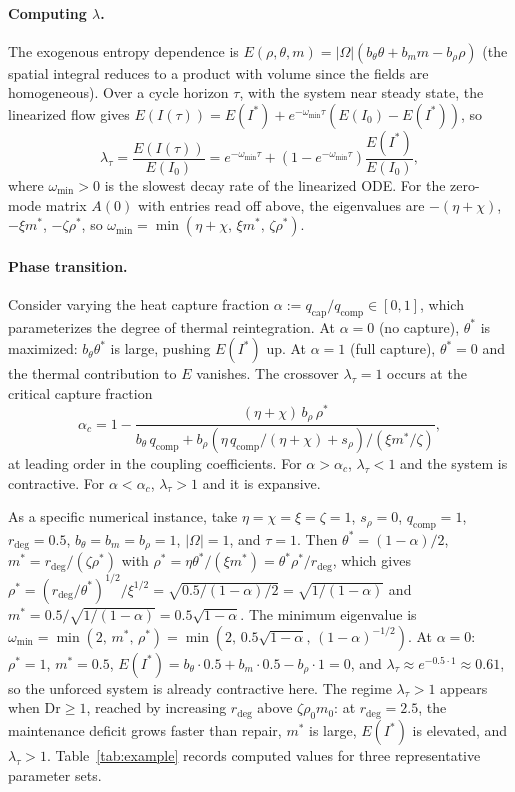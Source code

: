 \documentclass[10pt,twocolumn]{article}
\theoremstyle{plain}
\theoremstyle{definition}
\theoremstyle{remark}
\begin{document}
\paragraph{Computing $\lambda$.} The exogenous entropy dependence is
$E(\rho,\theta,m) = |\Omega|(b_\theta\theta + b_m m - b_\rho\rho)$ (the
spatial integral reduces to a product with volume since the fields are
homogeneous). Over a cycle horizon $\tau$, with the system near steady
state, the linearized flow gives
$E(I(\tau)) = E(I^*) + e^{-\omega_{\min}\tau}(E(I_0) - E(I^*))$, so
\[
  \lambda_\tau = \frac{E(I(\tau))}{E(I_0)}
  = e^{-\omega_{\min}\tau} + (1 - e^{-\omega_{\min}\tau})
    \frac{E(I^*)}{E(I_0)},
\]
where $\omega_{\min} > 0$ is the slowest decay rate of the linearized
ODE. For the zero-mode matrix $A(0)$ with entries read off above, the
eigenvalues are $-(\eta+\chi)$, $-\xi m^*$, $-\zeta\rho^*$, so
$\omega_{\min} = \min(\eta+\chi,\,\xi m^*,\,\zeta\rho^*)$.

\paragraph{Phase transition.} Consider varying the heat capture
fraction $\alpha := q_{\mathrm{cap}}/q_{\mathrm{comp}} \in [0,1]$, which
parameterizes the degree of thermal reintegration. At $\alpha = 0$ (no
capture), $\theta^*$ is maximized: $b_\theta\theta^*$ is large,
pushing $E(I^*)$ up. At $\alpha = 1$ (full capture), $\theta^* = 0$
and the thermal contribution to $E$ vanishes. The crossover
$\lambda_\tau = 1$ occurs at the critical capture fraction
\[
  \alpha_c = 1 - \frac{(\eta+\chi)\,b_\rho\,\rho^*}
    {b_\theta\,q_{\mathrm{comp}} + b_\rho(\eta\,q_{\mathrm{comp}}/(\eta+\chi) + s_\rho)/(\xi m^*/\zeta)},
\]
at leading order in the coupling coefficients. For $\alpha > \alpha_c$,
$\lambda_\tau < 1$ and the system is contractive. For $\alpha < \alpha_c$,
$\lambda_\tau > 1$ and it is expansive.

As a specific numerical instance, take $\eta = \chi = \xi = \zeta = 1$,
$s_\rho = 0$, $q_{\mathrm{comp}} = 1$, $r_{\mathrm{deg}} = 0.5$,
$b_\theta = b_m = b_\rho = 1$, $|\Omega| = 1$, and $\tau = 1$.
Then $\theta^* = (1-\alpha)/2$, $m^* = r_{\mathrm{deg}}/(\zeta\rho^*)$
with $\rho^* = \eta\theta^*/(\xi m^*) = \theta^*\rho^*/r_{\mathrm{deg}}$,
which gives $\rho^* = (r_{\mathrm{deg}}/\theta^*)^{1/2}/\xi^{1/2} =
\sqrt{0.5/(1-\alpha)/2} = \sqrt{1/(1-\alpha)}$ and
$m^* = 0.5/\sqrt{1/(1-\alpha)} = 0.5\sqrt{1-\alpha}$.
The minimum eigenvalue is
$\omega_{\min} = \min(2,\, m^*,\, \rho^*) = \min(2,\, 0.5\sqrt{1-\alpha},\,
(1-\alpha)^{-1/2})$. At $\alpha = 0$: $\rho^* = 1$, $m^* = 0.5$,
$E(I^*) = b_\theta\cdot 0.5 + b_m\cdot 0.5 - b_\rho\cdot 1 = 0$, and
$\lambda_\tau \approx e^{-0.5\cdot 1} \approx 0.61$, so the unforced
system is already contractive here. The regime $\lambda_\tau > 1$
appears when $\mathrm{Dr} \geq 1$, reached by increasing $r_{\mathrm{deg}}$
above $\zeta\rho_0 m_0$: at $r_{\mathrm{deg}} = 2.5$, the maintenance
deficit grows faster than repair, $m^*$ is large, $E(I^*)$ is elevated,
and $\lambda_\tau > 1$. Table~\ref{tab:example} records computed values
for three representative parameter sets.
\end{document}
